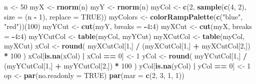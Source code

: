 \documentclass[]{book}
\newenvironment{Shaded}{\begin{snugshade}}{\end{snugshade}}
\newcommand{\KeywordTok}[1]{\textcolor[rgb]{0.13,0.29,0.53}{\textbf{#1}}}
\newcommand{\DataTypeTok}[1]{\textcolor[rgb]{0.13,0.29,0.53}{#1}}
\newcommand{\DecValTok}[1]{\textcolor[rgb]{0.00,0.00,0.81}{#1}}
\newcommand{\StringTok}[1]{\textcolor[rgb]{0.31,0.60,0.02}{#1}}
\newcommand{\OtherTok}[1]{\textcolor[rgb]{0.56,0.35,0.01}{#1}}
\newcommand{\OperatorTok}[1]{\textcolor[rgb]{0.81,0.36,0.00}{\textbf{#1}}}
\newcommand{\NormalTok}[1]{#1}
\theoremstyle{definition}
\theoremstyle{definition}
\theoremstyle{definition}
\theoremstyle{remark}
\begin{document}
\begin{Shaded}
\begin{Highlighting}[]
\NormalTok{n <-}\StringTok{ }\DecValTok{50}
\NormalTok{myX <-}\StringTok{ }\KeywordTok{rnorm}\NormalTok{(n)}
\NormalTok{myY <-}\StringTok{ }\KeywordTok{rnorm}\NormalTok{(n)}
\NormalTok{myCol <-}\StringTok{ }\KeywordTok{c}\NormalTok{(}\DecValTok{2}\NormalTok{, }\KeywordTok{sample}\NormalTok{(}\KeywordTok{c}\NormalTok{(}\DecValTok{4}\NormalTok{, }\DecValTok{2}\NormalTok{), }\DataTypeTok{size =}\NormalTok{ (n }\OperatorTok{-}\StringTok{ }\DecValTok{1}\NormalTok{), }\DataTypeTok{replace =} \OtherTok{TRUE}\NormalTok{))}
\NormalTok{myColors <-}\StringTok{ }\KeywordTok{colorRampPalette}\NormalTok{(}\KeywordTok{c}\NormalTok{(}\StringTok{"blue"}\NormalTok{, }\StringTok{"red"}\NormalTok{))(}\DecValTok{100}\NormalTok{)}
\NormalTok{myYCut <-}\StringTok{ }\KeywordTok{cut}\NormalTok{(myY, }\DataTypeTok{breaks =} \OperatorTok{-}\DecValTok{4}\OperatorTok{:}\DecValTok{4}\NormalTok{)}
\NormalTok{myXCut <-}\StringTok{ }\KeywordTok{cut}\NormalTok{(myX, }\DataTypeTok{breaks =} \OperatorTok{-}\DecValTok{4}\OperatorTok{:}\DecValTok{4}\NormalTok{)}
\NormalTok{myYCutCol <-}\StringTok{ }\KeywordTok{table}\NormalTok{(myCol, myYCut)}
\NormalTok{myXCutCol <-}\StringTok{ }\KeywordTok{table}\NormalTok{(myCol, myXCut)}
\NormalTok{xCol <-}\StringTok{ }\KeywordTok{round}\NormalTok{(}
\NormalTok{  myXCutCol[}\DecValTok{1}\NormalTok{,] }\OperatorTok{/}\StringTok{ }\NormalTok{(myXCutCol[}\DecValTok{1}\NormalTok{,] }\OperatorTok{+}\StringTok{ }\NormalTok{myXCutCol[}\DecValTok{2}\NormalTok{,]) }\OperatorTok{*}\StringTok{ }\DecValTok{100}
\NormalTok{)}
\NormalTok{xCol[}\KeywordTok{is.na}\NormalTok{(xCol) }\OperatorTok{|}\StringTok{ }\NormalTok{xCol }\OperatorTok{==}\StringTok{ }\DecValTok{0}\NormalTok{] <-}\StringTok{ }\DecValTok{1}
\NormalTok{yCol <-}\StringTok{ }\KeywordTok{round}\NormalTok{(}
\NormalTok{  myYCutCol[}\DecValTok{1}\NormalTok{,] }\OperatorTok{/}\StringTok{ }\NormalTok{(myYCutCol[}\DecValTok{1}\NormalTok{,] }\OperatorTok{+}\StringTok{ }\NormalTok{myYCutCol[}\DecValTok{2}\NormalTok{,]) }\OperatorTok{*}\StringTok{ }\DecValTok{100}
\NormalTok{)}
\NormalTok{yCol[}\KeywordTok{is.na}\NormalTok{(yCol) }\OperatorTok{|}\StringTok{ }\NormalTok{yCol }\OperatorTok{==}\StringTok{ }\DecValTok{0}\NormalTok{] <-}\StringTok{ }\DecValTok{1}
\NormalTok{op <-}\StringTok{ }\KeywordTok{par}\NormalTok{(}\DataTypeTok{no.readonly =} \OtherTok{TRUE}\NormalTok{)}
\KeywordTok{par}\NormalTok{(}\DataTypeTok{mar =} \KeywordTok{c}\NormalTok{(}\DecValTok{2}\NormalTok{, }\DecValTok{3}\NormalTok{, }\DecValTok{1}\NormalTok{, }\DecValTok{1}\NormalTok{))}

\end{Highlighting}
\end{Shaded}
\end{document}

